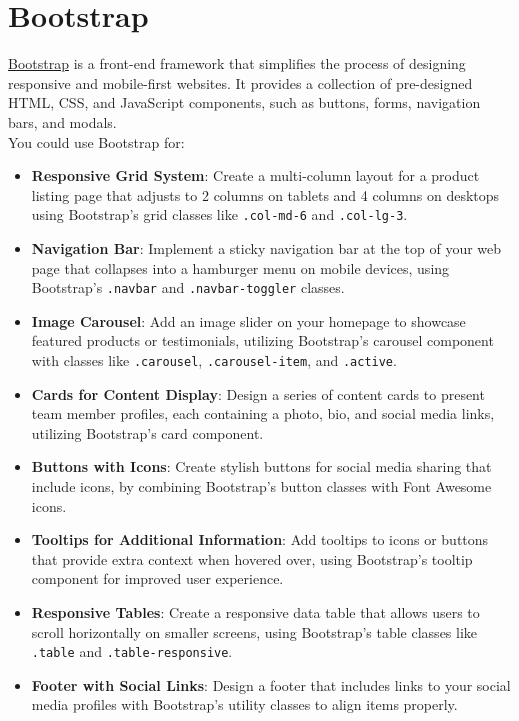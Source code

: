 
\section{Bootstrap} \label{sec:bootstrap}
\href{https://getbootstrap.com/}{Bootstrap} is a front-end framework that simplifies the process of designing responsive and mobile-first websites.
It provides a collection of pre-designed HTML, CSS, and JavaScript components, such as buttons, forms,
navigation bars, and modals.\\ \newline
You could use Bootstrap for:
\begin{itemize}
    \item \textbf{Responsive Grid System}:  
    Create a multi-column layout for a product listing page that adjusts to 2 columns on tablets and 4 columns on desktops using Bootstrap's grid classes like \texttt{.col-md-6} and \texttt{.col-lg-3}.

    \item \textbf{Navigation Bar}: 
    Implement a sticky navigation bar at the top of your web page that collapses into a hamburger menu on mobile devices, using Bootstrap's \texttt{.navbar} and \texttt{.navbar-toggler} classes.

    \item \textbf{Image Carousel}:
    Add an image slider on your homepage to showcase featured products or testimonials, utilizing Bootstrap's carousel component with classes like \texttt{.carousel}, \texttt{.carousel-item}, and \texttt{.active}.

    \item \textbf{Cards for Content Display}:
    Design a series of content cards to present team member profiles, each containing a photo, bio, and social media links, utilizing Bootstrap's card component.

    \item \textbf{Buttons with Icons}:
    Create stylish buttons for social media sharing that include icons, by combining Bootstrap’s button classes with Font Awesome icons.

    \item \textbf{Tooltips for Additional Information}:
    Add tooltips to icons or buttons that provide extra context when hovered over, using Bootstrap's tooltip component for improved user experience.

    \item \textbf{Responsive Tables}:
    Create a responsive data table that allows users to scroll horizontally on smaller screens, using Bootstrap’s table classes like \texttt{.table} and \texttt{.table-responsive}.

    \item \textbf{Footer with Social Links}:
    Design a footer that includes links to your social media profiles with Bootstrap’s utility classes to align items properly.
\end{itemize}
